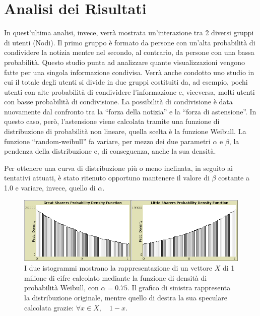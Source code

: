 \newpage
\section{Analisi dei Risultati}
\label{section:analisirisultati}






In quest'ultima analisi, invece, verrà mostrata un'interazione tra 2 diversi gruppi di utenti (Nodi).
Il primo gruppo è formato da persone con un'alta probabilità di condividere la notizia 
mentre nel secondo, al contrario, da persone con una bassa probabilità.
Questo studio punta ad analizzare quante visualizzazioni vengono fatte per una singola informazione condivisa.
Verrà anche condotto uno studio in cui il totale degli utenti si divide in due gruppi costituiti da, ad esempio, 
pochi utenti con alte probabilità di condividere l'informazione e, viceversa, 
molti utenti con basse probabilità di condivisione.
La possibilità di condivisione è data nuovamente dal confronto tra 
la ``forza della notizia'' e la ``forza di astensione''. 
In questo caso, però, l'astensione viene calcolata tramite una funzione di distribuzione di probabilità non lineare,
quella scelta è la funzione Weibull.
La funzione ``random-weibull'' fa variare, per mezzo dei due parametri $\alpha$ e $\beta$, la pendenza della distribuzione
e, di conseguenza, anche la sua densità.




Per ottenere una curva di distribuzione più o meno inclinata, in seguito ai tentativi attuati, 
è stato ritenuto opportuno mantenere il valore di $\beta$ costante a 1.0 e variare, invece, quello di $\alpha$.




\begin{figure}[!ht]
\centerline {
  \includegraphics[width=1.1\textwidth]{img/weibull-alpha-0.75.png}
}
\caption{I due istogrammi mostrano la rappresentazione di un vettore $X$ di 1 milione di cifre 
calcolato mediante la funzione di densità di probabilità Weibull, con $\alpha = 0.75$.
Il grafico di sinistra rappresenta la distribuzione originale, 
mentre quello di destra la sua speculare calcolata grazie: $\forall x \in X, \quad 1 - x$.}
\label{img:weibull_alpha_0_75}
\end{figure}

